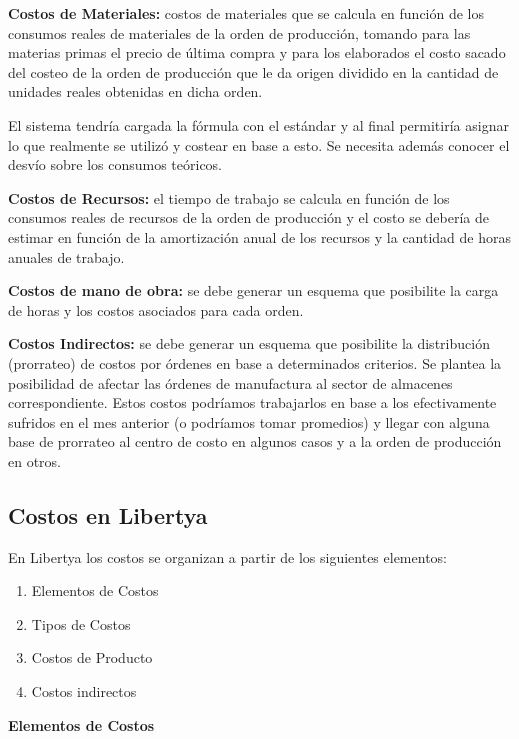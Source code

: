 \documentclass[letterpaper,10pt,spanish]{sphinxmanual}
\begin{document}
\textbf{Costos de Materiales:} costos de materiales que se calcula en función de los consumos reales de materiales de la orden de producción, tomando para las materias primas el precio de última compra y para los elaborados el costo sacado del costeo de la orden de producción que le da origen dividido en la cantidad de unidades reales obtenidas en dicha orden.

El sistema tendría cargada la fórmula con el estándar y al final permitiría asignar lo que realmente se utilizó y costear en base a esto. Se necesita además conocer el desvío sobre los consumos teóricos.

\textbf{Costos de Recursos:} el tiempo de trabajo se calcula en función de los consumos reales de recursos de la orden de producción y el costo se debería de estimar en función de la amortización anual de los recursos y la cantidad de horas anuales de trabajo.

\textbf{Costos de mano de obra:} se debe generar un esquema que posibilite la carga de horas y los costos asociados para cada orden.

\textbf{Costos Indirectos:} se debe generar un esquema que posibilite la distribución (prorrateo) de costos por órdenes en base a determinados criterios. Se plantea la posibilidad de  afectar las órdenes de manufactura al sector de almacenes correspondiente. Estos costos podríamos trabajarlos en base a los efectivamente sufridos en el mes anterior (o podríamos tomar promedios) y llegar con alguna base de prorrateo al centro de costo en algunos casos y a la orden de producción en otros.


\subsection{Costos en Libertya}
\label{manufactura-costos:costos-en-libertya}
En Libertya los costos se organizan a partir de los siguientes elementos:
\begin{enumerate}
\item {} 
Elementos de Costos

\item {} 
Tipos de Costos

\item {} 
Costos de Producto

\item {} 
Costos indirectos

\end{enumerate}

\textbf{Elementos de Costos}
\end{document}
